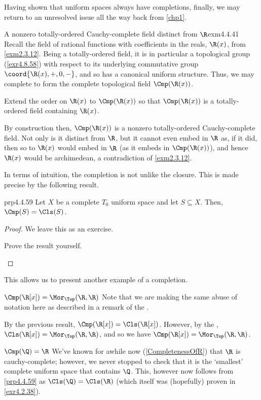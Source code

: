 Having shown that uniform spaces always have completions, finally, we may return to an unresolved issue all the way back from \cref{chp1}.
\begin{exm}{A nonzero totally-ordered Cau\-chy-complete field distinct from $\R$}{exm4.4.41}
Recall the field of rational functions with coefficients in the reals, $\R (x)$, from \cref{exm2.3.12}.  Being a totally-ordered field, it is in particular a topological group (\cref{exr4.8.58}) with respect to its underlying commutative group $\coord{\R (x),+,0,-}$, and so has a canonical uniform structure.  Thus, we may complete to form the complete topological field $\Cmp (\R (x))$.
\begin{exr}{}{}
Extend the order on $\R (x)$ to $\Cmp (\R (x))$ so that $\Cmp (\R (x))$ is a totally-ordered field containing $\R (x)$.
\end{exr}
By construction then, $\Cmp (\R (x))$ is a nonzero totally-ordered Cauchy-complete field.  Not only is it distinct from $\R$, but it cannot even embed in $\R$ as, if it did, then so to $\R (x)$ would embed in $\R$ (as it embeds in $\Cmp (\R (x))$), and hence $\R (x)$ would be archimedean, a contradiction of \cref{exm2.3.12}.
\end{exm}

In terms of intuition, the completion is not unlike the closure.  This is made precise by the following result.
\begin{prp}{}{prp4.4.59}
Let $X$ be a complete $T_0$ uniform space and let $S\subseteq X$.  Then, $\Cmp (S)=\Cls (S)$.
\begin{proof}
We leave this as an exercise.
\begin{exr}{}{}
Prove the result yourself.
\end{exr}
\end{proof}
\end{prp}
This allows us to present another example of a completion.
\begin{exm}{$\Cmp (\R [x])=\Mor _{\Top}(\R ,\R )$}{}
Note that we are making the same abuse of notation here as described in a remark of the .

By the previous result, $\Cmp (\R [x])=\Cls (\R [x])$.  However, by the , $\Cls (\R [x])=\Mor _{\Top}(\R ,\R )$, and so we have $\Cmp (\R [x])=\Mor _{\Top}(\R ,\R )$.
\end{exm}
\begin{exm}{$\Cmp (\Q )=\R$}{}
We've known for awhile now (\cref{CompletenessOfR}) that $\R$ is cauchy-complete; however, we never stopped to check that it is the `smallest' complete uniform space that contains $\Q$.  This, however now follows from \cref{prp4.4.59} as $\Cls (\Q )=\Cls (\R )$ (which itself was (hopefully) proven in \cref{exr4.2.38}).
\end{exm}

